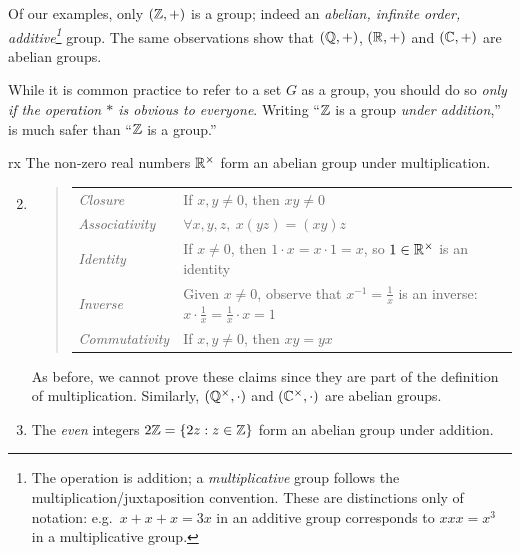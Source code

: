 Of our examples, only $(\mathbb{Z},+)$ is a group; indeed an \emph{abelian, infinite order, additive\footnote{\label{fn:additive}The operation is addition; a \emph{multiplicative} group follows the multiplication/juxtaposition convention. These are distinctions only of notation: e.g.\ $x+x+x=3x$ in an additive group corresponds to $xxx=x^3$ in a multiplicative group.}} group. The same observations show that $(\mathbb{Q},+)$, $(\mathbb{R},+)$ and $(\mathbb{C},+)$ are abelian groups.\par

While it is common practice to refer to a set $G$ as a group, you should do so \emph{only if the operation $\ast$ is obvious to everyone}. Writing ``$\mathbb{Z}$ is a group \emph{under addition},'' is much safer than ``$\mathbb{Z}$ is a group.''

\begin{examples}{}{rx}
	\exstart The non-zero real numbers $\mathbb{R}^\times$ form an abelian group under multiplication.\vspace{-5pt}
	\begin{enumerate}\setcounter{enumi}{1}\itemsep0pt
	  \item[]\begin{quote}\renewcommand{\arraystretch}{1.1}
			\begin{tabular}{@{}ll}
				\emph{Closure}&If $x,y\neq 0$, then $xy\neq 0$\\
				\emph{Associativity}&$\forall x,y,z,\ x(yz)=(xy)z$\\
				\emph{Identity}&If $x\neq 0$, then $1\cdot x=x\cdot 1=x$, so $1\in\mathbb{R}^\times$ is an identity\\
				\emph{Inverse}&Given $x\neq 0$, observe that $x^{-1}=\frac 1x$ is an inverse: $x\cdot \frac 1x=\frac 1x\cdot x=1$\\
				\emph{Commutativity}&If $x,y\neq 0$, then $xy=yx$
			\end{tabular}
		\end{quote}
		As before, we cannot prove these claims since they are part of the definition of multiplication.	Similarly, $(\mathbb{Q}^\times,\cdot)$ and $(\mathbb{C}^\times,\cdot)$ are abelian groups.
		
		  
	  \item The \emph{even} integers $2\mathbb{Z}=\{2z:z\in\mathbb{Z}\}$ form an abelian group under addition.
	  

\end{enumerate}
\end{examples}
